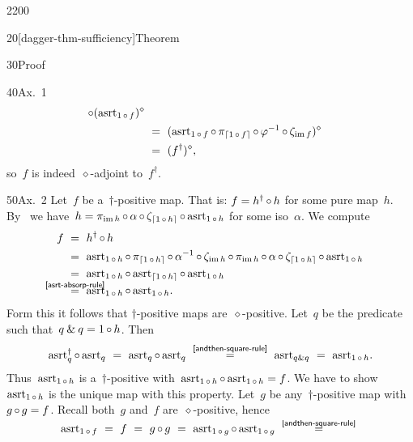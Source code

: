 \begin{parsec}{2200}
\begin{point}{20}[dagger-thm-sufficiency]{Theorem}
\begin{point}{30}{Proof}
\begin{point}{40}{Ax.~1}
\begin{align*}
   \after (\asrt_{1 \after f})^\diamond \\
   & \ = \ 
   (\asrt_{1 \after f} \after
   \pi_{\ceil{1 \after f}} \after
   {\varphi^{-1}} \after
   \zeta_{\IM f})^\diamond
   \\
   & \ = \ 
   (f^\dagger)^\diamond,
\end{align*}
so~$f$ is indeed~$\diamond$-adjoint to~$f^\dagger$.
\end{point}
\begin{point}{50}{Ax.~2}%
Let~$f$ be a~$\dagger$-positive map.
That is: $f = h^\dagger \mathop{\circ} h$ for some pure map~$h$.
By~\sref{standard-form-map}
    we have~$h =
    \pi_{\operatorname{im} h} \mathop{\circ} \alpha \mathop{\circ} \zeta_{\left\lceil1 \mathop{\circ} h\right\rceil}
                    \mathop{\circ} \mathrm{asrt}_{1 \mathop{\circ} h}
                    $
                    for some iso~$\alpha$.
            We compute
\begin{align*}
    f &\ = \ h^\dagger \after h \\
    &\ = \ 
    \asrt_{1 \after h} \after \pi_{\ceil{1 \after  h}} \after \alpha^{-1} \after \zeta_{\IM h} \after
    \pi_{\IM h} \after \alpha \after \zeta_{\ceil{1 \after h}}
                    \after \asrt_{1 \after h}
                    \\
    &\ = \ 
    \asrt_{1 \after h} \after \asrt_{\ceil{1 \after  h}}
                    \after \asrt_{1 \after h}
                    \\
                    &\ \overset{\smash{\mathclap{\sref{asrt-absorp-rule}}}}{=} \ 
    \asrt_{1 \after h} \after \asrt_{1 \after h}.
\end{align*}
Form this it follows that $\dagger$-positive maps are~$\diamond$-positive.
Let~$q$ be the predicate such that~$q \mathbin{\&} q = 1 \mathop{\circ} h$.
Then
\begin{equation*}
\asrt_{q}^\dagger \after \asrt_{q}  
    \ =\  \asrt_q\after \asrt_q
    \ \overset{\sref{andthen-square-rule}}{=}\  
    \asrt_{\andthen{q}{q}}
    \  =\  \asrt_{1 \after h}.
\end{equation*}
Thus~$\mathrm{asrt}_{1 \mathop{\circ} h}$ is a~$\dagger$-positive
    with~$\mathrm{asrt}_{1 \mathop{\circ} h} \mathop{\circ} \mathrm{asrt}_{1 \mathop{\circ} h} = f$.
We have to show~$\mathrm{asrt}_{1 \mathop{\circ} h}$
    is the unique map with this property.
Let~$g$ be any~$\dagger$-positive map with~$g \mathop{\circ} g = f$.
Recall both~$g$ and~$f$ are~$\diamond$-positive, hence
\begin{equation*}
    \asrt_{1 \after f} \ =\  f\ =\ g \after g \ = \ \asrt_{1 \after g}
            \after \asrt_{1 \after g}
            \ \overset{\smash{\sref{andthen-square-rule}}}{=}\  

\end{equation*}
\end{point}
\end{point}
\end{point}
\end{parsec}
